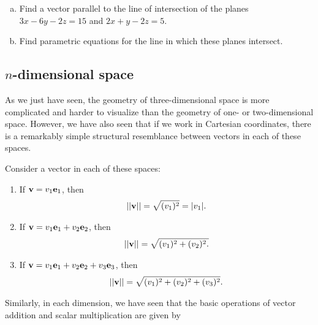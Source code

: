 \documentclass[12pt,letterpaper,reqno]{article}
\numberwithin{equation}{section}
\begin{document}
\begin{exercise}
\begin{enumerate}[(a)]
	\item Find a vector parallel to the line of intersection of the planes $3x-6y-2z=15$ and $2x+y-2z=5$.	
	\item Find parametric equations for the line in which these planes intersect.
\end{enumerate}
\end{exercise}

\subsection{$n$-dimensional space}
As we just have seen, the geometry of three-dimensional space is more complicated and harder to visualize than the geometry of one- or two-dimensional space. However, we have also seen that if we work in Cartesian coordinates, there is a remarkably simple structural resemblance between vectors in each of these spaces.

Consider a vector in each of these spaces:
\begin{enumerate}[(1)]
	\item If ${\bf v}=v_1{\bf e}_1$, then
		\begin{align*}
			||{\bf v}||=\sqrt{(v_1)^2}=|v_1|.
		\end{align*}
	\item If ${\bf v}=v_1{\bf e}_1+v_2{\bf e}_2$, then
		\begin{align*}
			||{\bf v}||=\sqrt{(v_1)^2+(v_2)^2.}
		\end{align*}
	\item If ${\bf v}=v_1{\bf e}_1+v_2{\bf e}_2+v_3{\bf e}_3$, then
		\begin{align*}
			||{\bf v}||=\sqrt{(v_1)^2+(v_2)^2+(v_3)^2}.
		\end{align*}
\end{enumerate} 
Similarly, in each dimension, we have seen that the basic operations of vector addition and scalar multiplication are given by
\end{document}
